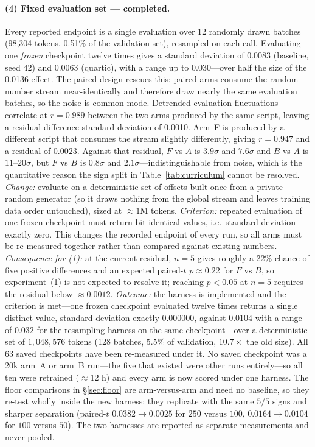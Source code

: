 \documentclass[11pt,a4paper]{article}
\begin{document}
\paragraph{(4) Fixed evaluation set --- \textnormal{completed}.} Every reported endpoint is a single evaluation over 12 randomly drawn batches (98{,}304 tokens, 0.51\% of the validation set), resampled on each call. Evaluating one \emph{frozen} checkpoint twelve times gives a standard deviation of 0.0083 (baseline, seed 42) and 0.0063 (quartic), with a range up to 0.030---over half the size of the 0.0136 effect. The paired design rescues this: paired arms consume the random number stream near-identically and therefore draw nearly the same evaluation batches, so the noise is common-mode. Detrended evaluation fluctuations correlate at $r=0.989$ between the two arms produced by the same script, leaving a residual difference standard deviation of 0.0010. Arm~F is produced by a different script that consumes the stream slightly differently, giving $r=0.947$ and a residual of 0.0023. Against that residual, $F$ vs $A$ is $3.9\sigma$ and $7.6\sigma$ and $B$ vs $A$ is $11$--$20\sigma$, but $F$ vs $B$ is $0.8\sigma$ and $2.1\sigma$---indistinguishable from noise, which is the quantitative reason the sign split in Table~\ref{tab:curriculum} cannot be resolved. \emph{Change:} evaluate on a deterministic set of offsets built once from a private random generator (so it draws nothing from the global stream and leaves training data order untouched), sized at ${\approx}1$M tokens. \emph{Criterion:} repeated evaluation of one frozen checkpoint must return bit-identical values, i.e.\ standard deviation exactly zero. This changes the recorded endpoint of every run, so all arms must be re-measured together rather than compared against existing numbers. \emph{Consequence for (1):} at the current residual, $n=5$ gives roughly a 22\% chance of five positive differences and an expected paired-$t$ $p\approx0.22$ for $F$ vs $B$, so experiment~(1) is not expected to resolve it; reaching $p<0.05$ at $n=5$ requires the residual below ${\approx}0.0012$. \emph{Outcome:} the harness is implemented and the criterion is met---one frozen checkpoint evaluated twelve times returns a single distinct value, standard deviation exactly $0.000000$, against $0.0104$ with a range of $0.032$ for the resampling harness on the same checkpoint---over a deterministic set of $1{,}048{,}576$ tokens (128 batches, $5.5$\% of validation, $10.7\times$ the old size). All 63 saved checkpoints have been re-measured under it. No saved checkpoint was a 20k arm~A or arm~B run---the five that existed were other runs entirely---so all ten were retrained ($\approx$12 h) and every arm is now scored under one harness. The floor comparisons in \S\ref{sec:floor} are arm-versus-arm and need no baseline, so they re-test wholly inside the new harness; they replicate with the same $5/5$ signs and sharper separation (paired-$t$ $0.0382 \to 0.0025$ for $250$ versus $100$, $0.0164 \to 0.0104$ for $100$ versus $50$). The two harnesses are reported as separate measurements and never pooled.
\end{document}
